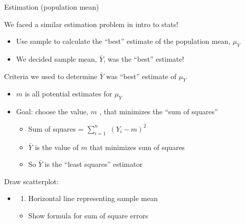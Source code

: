 \documentclass[
  8pt,
  ignorenonframetext,
  dvipsnames]{beamer}
\providecommand{\tightlist}{%
  \setlength{\itemsep}{0pt}\setlength{\parskip}{0pt}}
\let\olditem\item
\renewcommand{\item}{%
  \olditem\vspace{4pt}
}
\begin{document}
\begin{frame}{Estimation (population mean)}
\protect\hypertarget{estimation-population-mean}{}

We faced a similar estimation problem in intro to stats!

\begin{itemize}
\tightlist
\item
  Use sample to calculate the ``best'' estimate of the population mean,
  \(\mu_Y\)
\item
  We decided sample mean, \(\bar{Y}\), was the ``best'' estimate!
\end{itemize}

\medskip

Criteria we used to determine \(\bar{Y}\) was ``best'' estimate of
\(\mu_Y\)

\begin{itemize}
\tightlist
\item
  \(m\) is all potential estimates for \(\mu_Y\)
\item
  Goal: choose the value, \(m\) , that minimizes the ``sum of squares''

  \begin{itemize}
  \tightlist
  \item
    Sum of squares = \(\sum_{i=1}^{n}\) \((Y_i-m)^2\)
  \item
    \(\bar{Y}\) is the value of \(m\) that minimizes sum of squares
  \item
    So \(\bar{Y}\) is the ``least squares'' estimator
  \end{itemize}
\end{itemize}

\medskip

Draw scatterplot:

\begin{itemize}
\item
  \begin{enumerate}
  [(1)]
  \tightlist
  \item
    Horizontal line representing sample mean
  \end{enumerate}

  \begin{itemize}
  \tightlist
  \item
    Show formula for sum of square errors
  \end{itemize}
\end{itemize}

\end{frame}
\end{document}
